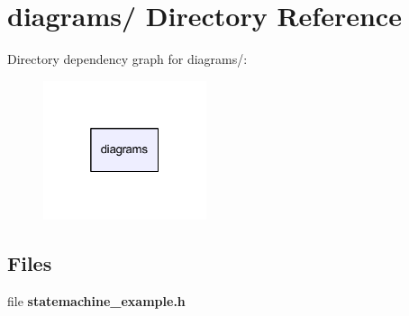 \section{diagrams/ Directory Reference}
\label{dir_0b0bc477635fa8977bc10c33af3943a2}
Directory dependency graph for diagrams/\-:\nopagebreak
\begin{figure}[H]
\begin{center}
\leavevmode
\includegraphics[width=136pt]{dir_0b0bc477635fa8977bc10c33af3943a2_dep}
\end{center}
\end{figure}
\subsection*{Files}
\begin{DoxyCompactItemize}
\item 
file {\bf statemachine\-\_\-example.\-h}
\end{DoxyCompactItemize}
